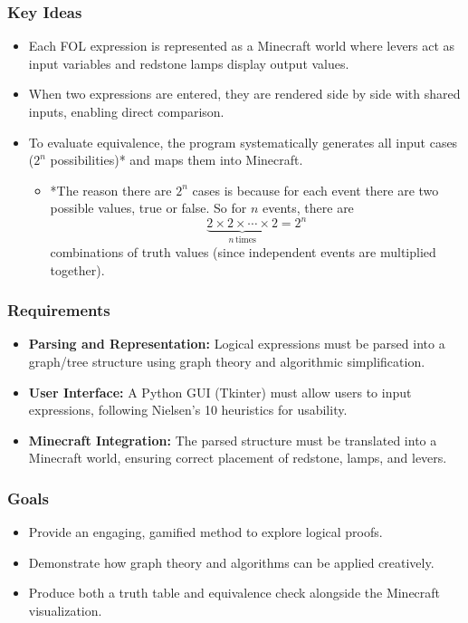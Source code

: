 \documentclass[11pt]{diazessay} %
\begin{document}
\subsubsection*{Key Ideas}
\begin{itemize}
    \item Each FOL expression is represented as a Minecraft world where levers act as input variables and redstone lamps display output values.  
    \item When two expressions are entered, they are rendered side by side with shared inputs, enabling direct comparison.  
    \item To evaluate equivalence, the program systematically generates all input cases ($2^n$ possibilities)* and maps them into Minecraft.
    \begin{itemize}
        \item *The reason there are $2^n$ cases is because for each event there are two possible values, true or false. So for $n$ events, there are \[
        \underbrace{2 \times 2 \times \cdots \times 2}_{n\,\mathrm{times}} = 2^n
		\]
	 combinations of truth values (since independent events are multiplied together).
	\end{itemize}
\end{itemize}

\subsubsection*{Requirements}
\begin{itemize}
    \item \textbf{Parsing and Representation:} Logical expressions must be parsed into a graph/tree structure using graph theory and algorithmic simplification.  
    \item \textbf{User Interface:} A Python GUI (Tkinter) must allow users to input expressions, following Nielsen’s 10 heuristics for usability.  
    \item \textbf{Minecraft Integration:} The parsed structure must be translated into a Minecraft world, ensuring correct placement of redstone, lamps, and levers.  
\end{itemize}

\subsubsection*{Goals}
\begin{itemize}
    \item Provide an engaging, gamified method to explore logical proofs.  
    \item Demonstrate how graph theory and algorithms can be applied creatively.  
    \item Produce both a truth table and equivalence check alongside the Minecraft visualization.  
\end{itemize}
\end{document}
